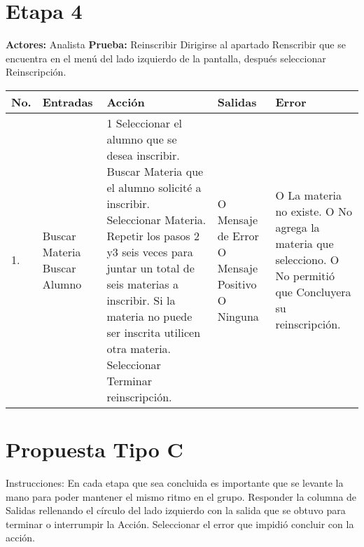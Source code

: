 \section*{Etapa 4}
\textbf{Actores:} Analista\newline
\textbf{Prueba:} Reinscribir\newline
Dirigirse al apartado Renscribir que se encuentra en el menú del lado izquierdo de la pantalla, después seleccionar Reinscripción.
\begin{longtable}{|p{0.7cm}|p{3cm}|p{6cm}|p{2.3cm}|p{3cm}|}
    \hline	
	\textbf{No.}
	&
	\textbf{Entradas}	
	&
	\textbf{Acción}
	&
	\textbf{Salidas}
	&
	\textbf{Error}
	\\
    \hline
	1.
	&
	Buscar Materia\newline
	Buscar Alumno	
	&
	1 Seleccionar el alumno que se desea inscribir.\newline
	2 Buscar Materia que el alumno solicité a inscribir.\newline
	3 Seleccionar Materia.\newline
	4 Repetir los pasos 2 y3 seis veces para juntar un total de seis materias a inscribir. Si la materia no puede ser inscrita utilicen otra materia.\newline
	5 Seleccionar Terminar reinscripción.
	&
	O Mensaje de Error\newline
 	O Mensaje Positivo\newline
 	O Ninguna	 	 
	&
 	O La materia no existe.\newline
 	O No agrega la materia que selecciono.\newline
 	O No permitió que Concluyera su reinscripción.\\
 	\hline
\end{longtable}
\newpage
\section{Propuesta Tipo C}
Instrucciones: En cada etapa que sea concluida es importante que se levante la mano para poder mantener el mismo ritmo en el grupo. Responder la columna de Salidas rellenando el círculo del lado izquierdo con la salida que se obtuvo para terminar o interrumpir la Acción. Seleccionar el error que impidió concluir con la acción.
